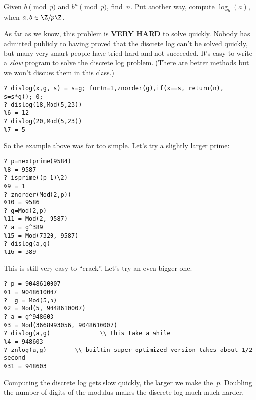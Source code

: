\documentclass[11pt]{report}
\begin{document}
 Given $b\pmod{p}$ and $b^n\pmod{p}$,
find~$n$.  Put another way, compute $\log_b(a)$, when
$a, b \in\Z/p\Z$.

As far as we know, this problem is {\bf VERY HARD} to solve quickly.
Nobody has admitted publicly to having proved that the discrete log
can't be solved quickly, but many very smart people have tried hard
and not succeeded.  It's easy to write a {\em slow} program to
solve the discrete log problem.  (There are better methods but we
won't discuss them in this class.)
\begin{verbatim}
? dislog(x,g, s) = s=g; for(n=1,znorder(g),if(x==s, return(n), s=s*g)); 0;
? dislog(18,Mod(5,23))
%6 = 12
? dislog(20,Mod(5,23))
%7 = 5
\end{verbatim}
So the example above was far too simple.  Let's try a slightly larger
prime:
\begin{verbatim}
? p=nextprime(9584)
%8 = 9587
? isprime((p-1)\2)
%9 = 1
? znorder(Mod(2,p))
%10 = 9586
? g=Mod(2,p)
%11 = Mod(2, 9587)
? a = g^389
%15 = Mod(7320, 9587)
? dislog(a,g)
%16 = 389
\end{verbatim}
This is still very easy to ``crack''.  Let's try an even bigger one.
\begin{verbatim}
? p = 9048610007
%1 = 9048610007
?  g = Mod(5,p)
%2 = Mod(5, 9048610007)
? a = g^948603
%3 = Mod(3668993056, 9048610007)
? dislog(a,g)              \\ this take a while
%4 = 948603
? znlog(a,g)        \\ builtin super-optimized version takes about 1/2 second
%31 = 948603
\end{verbatim}
Computing the discrete log gets slow quickly, the larger we make the~$p$.
Doubling the number of digits of the modulus makes the discrete log much
much harder.
\end{document}

